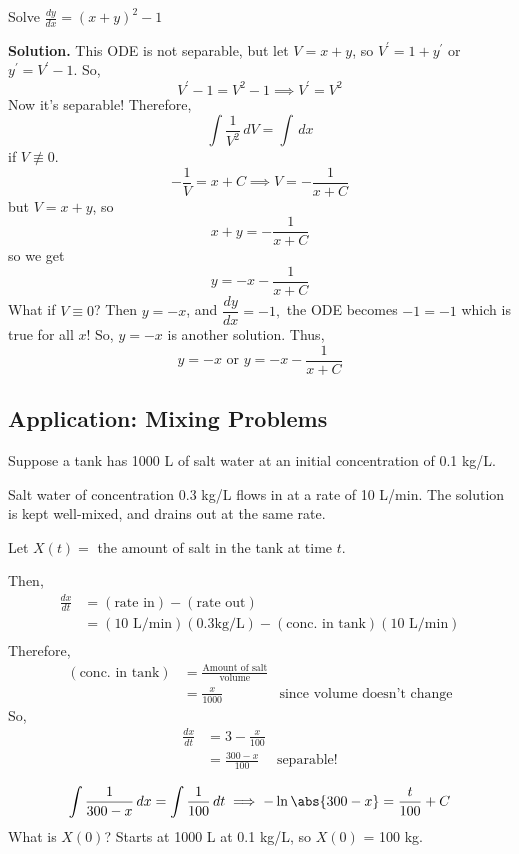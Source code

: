 \begin{Example}{}{}
    Solve
    $ \frac{dy}{dx} =(x+y)^2-1 $

    \textbf{Solution.} This ODE is not separable, but let $ V=x+y $, so
    $ V^\prime=1+y^\prime $ or $ y^\prime=V^\prime-1 $. So,
    \[ V^\prime-1=V^2-1\implies V^\prime=V^2 \]
    Now it's separable! Therefore,
    \[ \int \frac{1}{V^2} \, d{V} =\int \, d{x} \]
    if $ V\not\equiv 0 $.
    \[ -\frac{1}{V} =x+C\implies V=-\frac{1}{x+C} \]
    but $ V=x+y $, so
    \[ x+y=-\frac{1}{x+C} \]
    so we get
    \[ y=-x-\frac{1}{x+C} \]
    What if $ V\equiv 0 $? Then $ y=-x $, and $ \dfrac{dy}{dx}=-1, $ the ODE becomes
    $ -1=-1 $ which is true for all $ x $! So, $ y=-x $ is another solution. Thus,
    \[ y=-x\text{ or }y=-x-\frac{1}{x+C} \]
\end{Example}

\subsection*{Application: Mixing Problems}
Suppose a tank has 1000 L of salt water at an initial concentration of
0.1 kg/L.

Salt water of concentration 0.3 kg/L flows in at a rate of 10 L/min. The solution is
kept well-mixed, and drains out at the same rate.

Let $ X(t)= $ the amount of salt in the tank at time $ t $.

Then,
\begin{align*}
    \frac{dx}{dt}
     & =(\text{rate in})-(\text{rate out})                                         \\
     & =(10\text{ L/min})(0.3\text{kg/L})-(\text{conc.\ in tank})(10\text{ L/min}) \\
\end{align*}
Therefore,
\begin{align*}
    (\text{conc.\ in tank})
     & =\frac{\text{Amount of salt}}{\text{volume}}                                      \\
     & =\frac{x}{1000}                              & \text{since volume doesn't change}
\end{align*}
So,
\begin{align*}
    \frac{dx}{dt}
     & =3-\frac{x}{100}                       \\
     & =\frac{300-x}{100} & \text{separable!} \\
\end{align*}
\[ \int \frac{1}{300-x} \, d{x}=\int \frac{1}{100} \, d{t} \implies -\ln\abs{300-x}=\frac{t}{100} +C \]
What is $ X(0) $? Starts at 1000 L at 0.1 kg/L, so $ X(0) $ = 100 kg.

